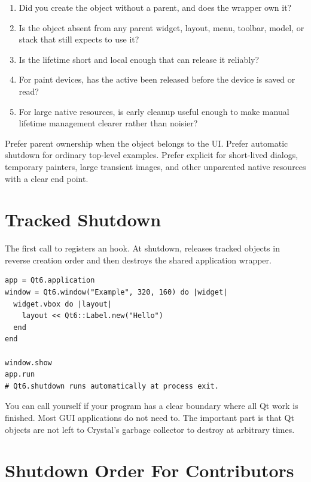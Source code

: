 \begin{enumerate}
\item Did you create the object without a parent, and does the wrapper own it?
\item Is the object absent from any parent widget, layout, menu, toolbar, model, or stack that still expects to use it?
\item Is the lifetime short and local enough that  can release it reliably?
\item For paint devices, has the active  been released before the device is saved or read?
\item For large native resources, is early cleanup useful enough to make manual lifetime management clearer rather than noisier?
\end{enumerate}

Prefer parent ownership when the object belongs to the UI. Prefer automatic shutdown for ordinary top-level examples. Prefer explicit  for short-lived dialogs, temporary painters, large transient images, and other unparented native resources with a clear end point.

\section{Tracked Shutdown}

The first call to  registers an  hook. At shutdown,  releases tracked objects in reverse creation order and then destroys the shared application wrapper.

\begin{lstlisting}[style=crystal]
app = Qt6.application
window = Qt6.window("Example", 320, 160) do |widget|
  widget.vbox do |layout|
    layout << Qt6::Label.new("Hello")
  end
end

window.show
app.run
# Qt6.shutdown runs automatically at process exit.
\end{lstlisting}

You can call  yourself if your program has a clear boundary where all Qt work is finished. Most GUI applications do not need to. The important part is that Qt objects are not left to Crystal's garbage collector to destroy at arbitrary times.

\section{Shutdown Order For Contributors}

